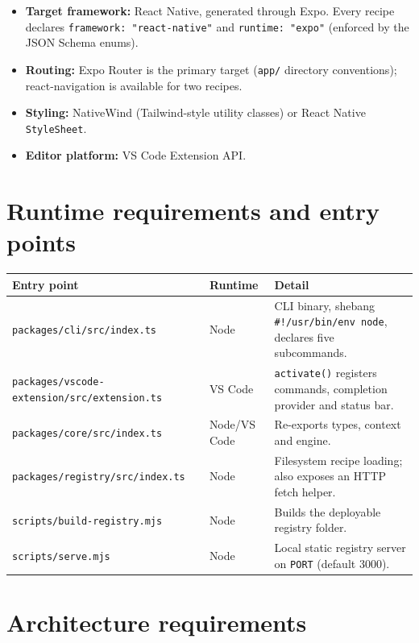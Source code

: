 \begin{itemize}
  \item \textbf{Target framework:} React Native, generated through Expo. Every
        recipe declares \texttt{framework: "react-native"} and
        \texttt{runtime: "expo"} (enforced by the JSON Schema enums).
  \item \textbf{Routing:} Expo Router is the primary target
        (\texttt{app/} directory conventions); react-navigation is available for
        two recipes.
  \item \textbf{Styling:} NativeWind (Tailwind-style utility classes) or React
        Native \texttt{StyleSheet}.
  \item \textbf{Editor platform:} VS Code Extension API.
\end{itemize}

\section{Runtime requirements and entry points}

\begin{longtable}{@{}L{4cm}L{1.9cm}L{8.3cm}@{}}
\toprule
\textbf{Entry point} & \textbf{Runtime} & \textbf{Detail} \\
\midrule
\endhead
\texttt{packages/cli/src/index.ts} & Node & CLI binary, shebang \texttt{\#!/usr/bin/env node},
declares five subcommands. \\
\texttt{packages/vscode-extension/src/extension.ts} & VS Code & \texttt{activate()} registers commands, completion provider and status bar. \\
\texttt{packages/core/src/index.ts} & Node/VS Code & Re-exports types, context and engine. \\
\texttt{packages/registry/src/index.ts} & Node & Filesystem recipe loading; also exposes an HTTP fetch helper. \\
\texttt{scripts/build-registry.mjs} & Node & Builds the deployable registry folder. \\
\texttt{scripts/serve.mjs} & Node & Local static registry server on \texttt{PORT} (default 3000). \\
\bottomrule
\end{longtable}

\section{Architecture requirements}

